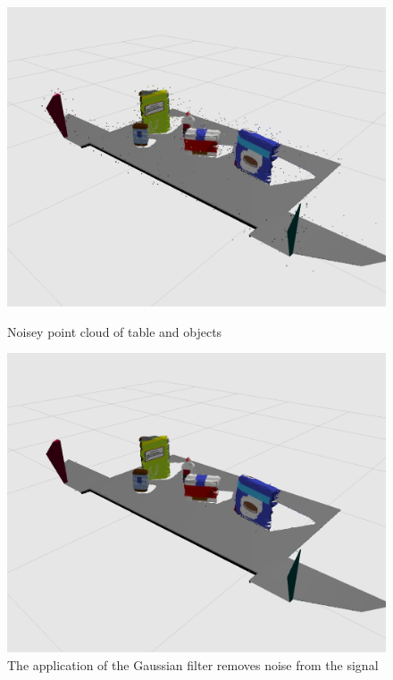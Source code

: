 \documentclass[a4paper]{article}
\begin{document}
\vspace{1cm}

\begin{figure}[h]
\centering
\begin{minipage}{0.45\linewidth}
\centering
\includegraphics[scale=0.2]{image11}
\caption{Noisey point cloud of table and objects}
\end{minipage}
\hspace{0.5cm}
\begin{minipage}{0.45\linewidth}
\centering
\includegraphics[scale=0.2]{image5}
\caption{The application of the Gaussian filter removes noise from the signal}
\end{minipage}
\end{figure}
\end{document}

